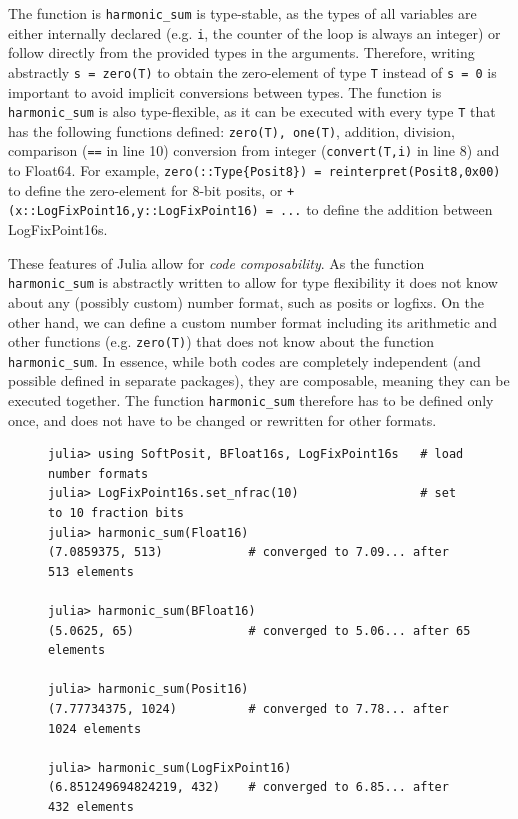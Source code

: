 The function is \texttt{harmonic\_sum} is type-stable, as the types of all variables are either internally declared (e.g.
\texttt{i}, the counter of the loop is always an integer) or follow directly from the provided types in the arguments.
Therefore, writing abstractly \texttt{s = zero(T)} to obtain the zero-element of type \texttt{T} instead of \texttt{s = 0}
is important to avoid implicit conversions between types. The function is \texttt{harmonic\_sum} is also type-flexible,
as it can be executed with every type \texttt{T} that has the following functions defined: \texttt{zero(T), one(T)}, addition,
division, comparison (\texttt{==} in line 10) conversion from integer (\texttt{convert(T,i)} in line 8) and to Float64.
For example, \texttt{zero(::Type\{Posit8\}) = reinterpret(Posit8,0x00)} to define the zero-element for 8-bit posits, or
\texttt{+(x::LogFixPoint16,y::LogFixPoint16) = ...} to define the addition between LogFixPoint16s.

These features of Julia allow for \emph{code composability}. As the function \texttt{harmonic\_sum} is abstractly written
to allow for type flexibility it does not know about any (possibly custom) number format, such as posits or logfixs.
On the other hand, we can define a custom number format including its arithmetic and other functions
(e.g. \texttt{zero(T)}) that does not know about the function \texttt{harmonic\_sum}. In essence, while both codes
are completely independent (and possible defined in separate packages), they are composable, meaning they can
be executed together. The function \texttt{harmonic\_sum} therefore has to be defined only once, and does not have
to be  changed or rewritten for other formats.

\begin{figure}[tbhp]
\begin{lstlisting}[language=JuliaLocal, label=lst:harmonic_sum2, caption={\textbf{Executing \texttt{harmonic\_sum} with different
number formats in the Julia shell.} The number format is passed on as an argument, causing the function \texttt{harmonic\_sum}
to be compiled and executed with that format. Depending on the precision of the number format, the harmonic sum converges
after 65 (BFloat16) to 1024 elements (Posit16).}]
julia> using SoftPosit, BFloat16s, LogFixPoint16s   # load number formats
julia> LogFixPoint16s.set_nfrac(10)                 # set to 10 fraction bits
julia> harmonic_sum(Float16)
(7.0859375, 513)            # converged to 7.09... after 513 elements

julia> harmonic_sum(BFloat16)
(5.0625, 65)                # converged to 5.06... after 65 elements

julia> harmonic_sum(Posit16)
(7.77734375, 1024)          # converged to 7.78... after 1024 elements

julia> harmonic_sum(LogFixPoint16)
(6.851249694824219, 432)    # converged to 6.85... after 432 elements
\end{lstlisting}
\end{figure}

